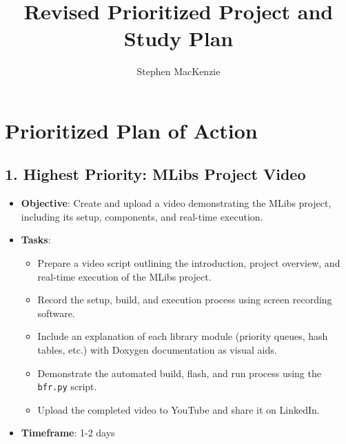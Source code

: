 \documentclass[a4paper,10pt]{article}
\title{Revised Prioritized Project and Study Plan}
\author{Stephen MacKenzie}
\date{}
\begin{document}
\maketitle

\section*{Prioritized Plan of Action}

\subsection*{1. Highest Priority: MLibs Project Video}
\begin{itemize}
    \item \textbf{Objective}: Create and upload a video demonstrating the MLibs project, including its setup, components, and real-time execution.
    \item \textbf{Tasks}:
    \begin{itemize}
        \item Prepare a video script outlining the introduction, project overview, and real-time execution of the MLibs project.
        \item Record the setup, build, and execution process using screen recording software.
        \item Include an explanation of each library module (priority queues, hash tables, etc.) with Doxygen documentation as visual aids.
        \item Demonstrate the automated build, flash, and run process using the \texttt{bfr.py} script.
        \item Upload the completed video to YouTube and share it on LinkedIn.
    \end{itemize}
    \item \textbf{Timeframe}: 1-2 days
\end{itemize}
\end{document}
